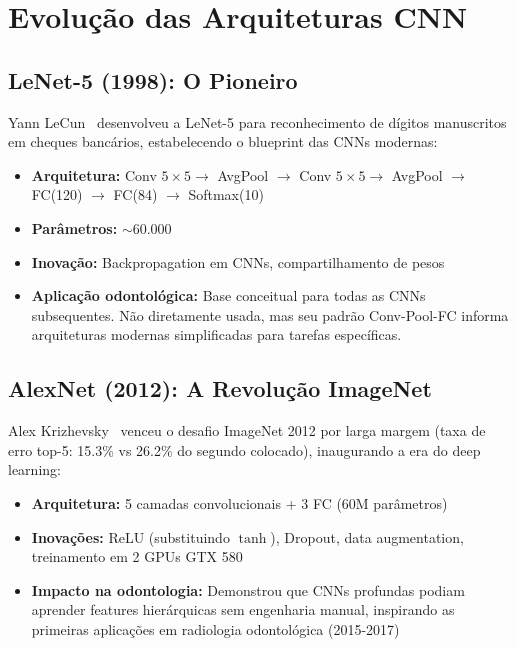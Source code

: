 \section{Evolução das Arquiteturas CNN}
\label{sec:evolucao-cnn}

\subsection{LeNet-5 (1998): O Pioneiro}

Yann LeCun~\cite{lecun2015deep} desenvolveu a LeNet-5 para reconhecimento de dígitos manuscritos
em cheques bancários, estabelecendo o blueprint das CNNs modernas:

\begin{itemize}
  \item \textbf{Arquitetura:} Conv $5\times5 \to$ AvgPool $\to$ Conv $5\times5
        \to$ AvgPool $\to$ FC(120) $\to$ FC(84) $\to$ Softmax(10)
  \item \textbf{Parâmetros:} $\sim$60.000
  \item \textbf{Inovação:} Backpropagation em CNNs, compartilhamento de pesos
  \item \textbf{Aplicação odontológica:} Base conceitual para todas as CNNs
        subsequentes. Não diretamente usada, mas seu padrão Conv-Pool-FC informa
        arquiteturas modernas simplificadas para tarefas específicas.
\end{itemize}

\subsection{AlexNet (2012): A Revolução ImageNet}

Alex Krizhevsky~\cite{krizhevsky2012imagenet} venceu o desafio ImageNet 2012 por larga margem (taxa de erro
top-5: 15.3\% vs 26.2\% do segundo colocado), inaugurando a era do deep learning:

\begin{itemize}
  \item \textbf{Arquitetura:} 5 camadas convolucionais + 3 FC (60M parâmetros)
  \item \textbf{Inovações:} ReLU (substituindo $\tanh$), Dropout, data augmentation,
        treinamento em 2 GPUs GTX 580
  \item \textbf{Impacto na odontologia:} Demonstrou que CNNs profundas podiam
        aprender features hierárquicas sem engenharia manual, inspirando as
        primeiras aplicações em radiologia odontológica (2015-2017)
\end{itemize}

